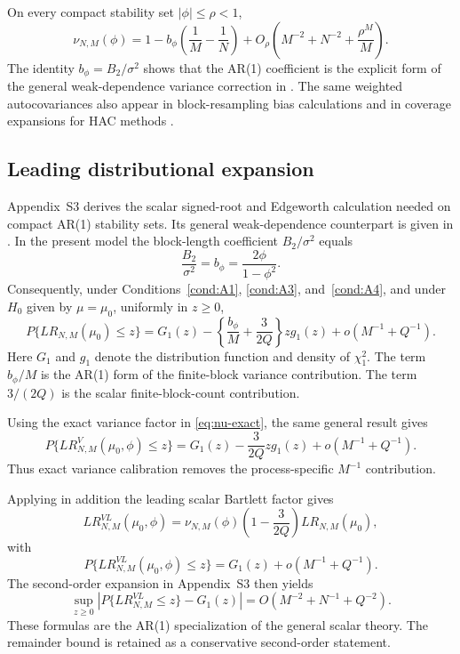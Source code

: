 \documentclass[12pt]{article}
\theoremstyle{remark}
\begin{document}
On every compact stability set $|\phi|\le\rho<1$,
\begin{equation}
\nu_{N,M}(\phi)
=1-b_\phi\left(\frac1M-\frac1N\right)
+O_\rho\left(M^{-2}+N^{-2}+\frac{\rho^M}{M}\right).
\label{eq:nu-expansion}
\end{equation}
The identity $b_\phi=B_2/\sigma^2$ shows that the AR(1) coefficient is the explicit form of the general weak-dependence variance correction in \citet{Alksnis.Valeinis:2026}. The same weighted autocovariances also appear in block-resampling bias calculations and in coverage expansions for HAC methods \citep{Kunsch:1989,Sun.etal:2008}.

\subsection{Leading distributional expansion}

Appendix~S3 derives the scalar signed-root and Edgeworth calculation needed on compact AR(1) stability sets. Its general weak-dependence counterpart is given in \citet{Alksnis.Valeinis:2026}. In the present model the block-length coefficient $B_2/\sigma^2$ equals
\[
\frac{B_2}{\sigma^2}=b_\phi=\frac{2\phi}{1-\phi^2}.
\]
Consequently, under Conditions~\ref{cond:A1}, \ref{cond:A3}, and~\ref{cond:A4}, and under $H_0$ given by $\mu=\mu_0$, uniformly in $z\ge0$,
\begin{equation}
P\{LR_{N,M}(\mu_0)\le z\}
=G_1(z)-\left\{\frac{b_\phi}{M}+\frac{3}{2Q}\right\}zg_1(z)
+o(M^{-1}+Q^{-1}).
\label{eq:ar1-raw-bel-expansion}
\end{equation}
Here $G_1$ and $g_1$ denote the distribution function and density of $\chi_1^2$. The term $b_\phi/M$ is the AR(1) form of the finite-block variance contribution. The term $3/(2Q)$ is the scalar finite-block-count contribution.

Using the exact variance factor in \eqref{eq:nu-exact}, the same general result gives
\begin{equation}
P\{LR^V_{N,M}(\mu_0,\phi)\le z\}
=G_1(z)-\frac{3}{2Q}zg_1(z)+o(M^{-1}+Q^{-1}).
\label{eq:ar1-vc-bel-expansion}
\end{equation}
Thus exact variance calibration removes the process-specific $M^{-1}$ contribution.

Applying in addition the leading scalar Bartlett factor gives
\begin{equation}
LR^{VL}_{N,M}(\mu_0,\phi)
=\nu_{N,M}(\phi)\left(1-\frac{3}{2Q}\right)LR_{N,M}(\mu_0),
\label{eq:leading-corrected-stat}
\end{equation}
with
\begin{equation}
P\{LR^{VL}_{N,M}(\mu_0,\phi)\le z\}
=G_1(z)+o(M^{-1}+Q^{-1}).
\label{eq:leading-corrected-expansion}
\end{equation}
The second-order expansion in Appendix~S3 then yields
\begin{equation}
\sup_{z\ge0}\left|P\{LR^{VL}_{N,M}\le z\}-G_1(z)\right|
=O(M^{-2}+N^{-1}+Q^{-2}).
\label{eq:leading-second-order-bound}
\end{equation}
These formulas are the AR(1) specialization of the general scalar theory. The remainder bound is retained as a conservative second-order statement.
\end{document}
